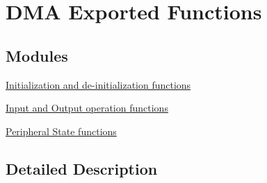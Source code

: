\hypertarget{group___d_m_a___exported___functions}{\section{D\-M\-A Exported Functions}
\label{group___d_m_a___exported___functions}
}
\subsection*{Modules}
\begin{DoxyCompactItemize}
\item 
\hyperlink{group___d_m_a___exported___functions___group1}{Initialization and de-\/initialization functions}
\item 
\hyperlink{group___d_m_a___exported___functions___group2}{Input and Output operation functions}
\item 
\hyperlink{group___d_m_a___exported___functions___group3}{Peripheral State functions}
\end{DoxyCompactItemize}


\subsection{Detailed Description}
